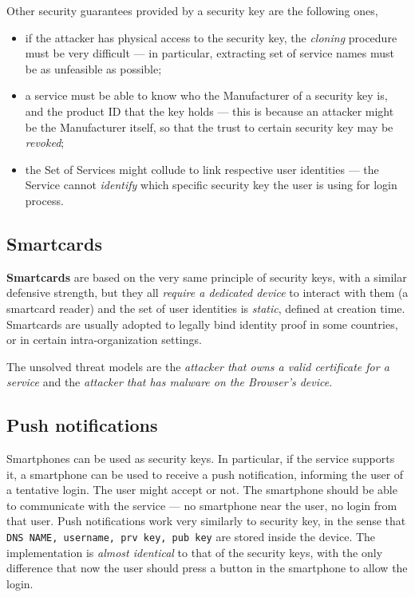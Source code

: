\documentclass[10pt]{\classname}
\begin{document}
Other security guarantees provided by a security key are the following ones,
\begin{itemize}
    \item if the attacker has physical access to the security key, the
        \emph{cloning} procedure must be very difficult --- in particular,
        extracting set of service names must be as unfeasible as possible;
    \item a service must be able to know who the Manufacturer of a security key
        is, and the product ID that the key holds --- this is because an
        attacker might be the Manufacturer itself, so that the trust to certain
        security key may be \emph{revoked};
    \item the Set of Services might collude to link respective user identities
        --- the Service cannot \emph{identify} which specific security key the
        user is using for login process.
\end{itemize}

\subsection{Smartcards}

\textbf{Smartcards} are based on the very same principle of security keys, with
a similar defensive strength, but they all \emph{require a dedicated device} to
interact with them (a smartcard reader) and the set of user identities is
\emph{static}, defined at creation time. Smartcards are usually adopted to
legally bind identity proof in some countries, or in certain
intra\--organization settings.


The unsolved threat models are the \emph{attacker that owns a valid certificate
for a service} and the \emph{attacker that has malware on the Browser's
device}.

\subsection{Push notifications}

Smartphones can be used as security keys. In particular, if the service
supports it, a smartphone can be used to receive a push notification, informing
the user of a tentative login. The user might accept or not. The smartphone
should be able to communicate with the service --- no smartphone near the user,
no login from that user. Push notifications work very similarly to security
key, in the sense that \texttt{DNS NAME, username, prv key, pub key} are stored
inside the device. The implementation is \emph{almost identical} to that of the
security keys, with the only difference that now the user should press a button
in the smartphone to allow the login.
\end{document}
